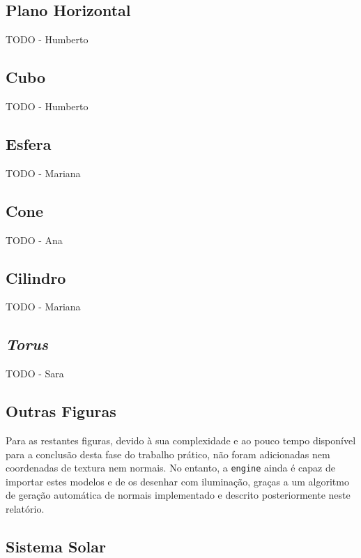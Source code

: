 \documentclass[12pt, a4paper]{article}
\begin{document}
\subsection{Plano Horizontal}

{\color{red} TODO - Humberto}

\subsection{Cubo}

{\color{red} TODO - Humberto}

\subsection{Esfera}

{\color{red} TODO - Mariana}

\subsection{Cone}

{\color{red} TODO - Ana}

\subsection{Cilindro}

{\color{red} TODO - Mariana}

\subsection{\emph{Torus}}

{\color{red} TODO - Sara}

\subsection{Outras Figuras}

Para as restantes figuras, devido à sua complexidade e ao pouco tempo disponível para a conclusão
desta fase do trabalho prático, não foram adicionadas nem coordenadas de textura nem normais. No
entanto, a \texttt{engine} ainda é capaz de importar estes modelos e de os desenhar com iluminação,
graças a um algoritmo de geração automática de normais implementado e descrito posteriormente neste
relatório.

\subsection{Sistema Solar}
\end{document}
